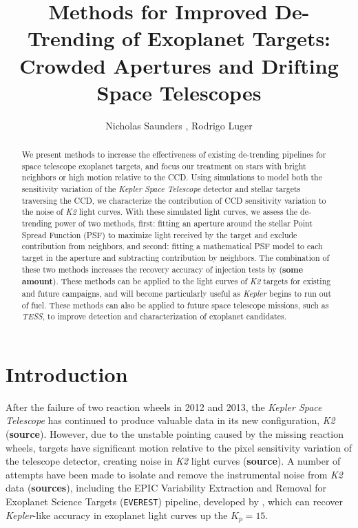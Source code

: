 \documentclass[12pt,preprint]{aastex}
\begin{document}
\title{
	Methods for Improved De-Trending of Exoplanet Targets: Crowded Apertures and Drifting Space Telescopes
}

\author{Nicholas Saunders , Rodrigo Luger }



\begin{abstract}

	We present methods to increase the effectiveness of existing de-trending pipelines for space telescope exoplanet targets, and focus our treatment on stars with bright neighbors or high motion relative to the CCD. Using simulations to model both the sensitivity variation of the \textit{Kepler Space Telescope} detector and stellar targets traversing the CCD, we characterize the contribution of CCD sensitivity variation to the noise of \textit{K2} light curves. With these simulated light curves, we assess the de-trending power of two methods, first: fitting an aperture around the stellar Point Spread Function (PSF) to maximize light received by the target and exclude contribution from neighbors, and second: fitting a mathematical PSF model to each target in the aperture and subtracting contribution by neighbors. The combination of these two methods increases the recovery accuracy of injection tests by (\textbf{some amount}). These methods can be applied to the light curves of \textit{K2} targets for existing and future campaigns, and will become particularly useful as \textit{Kepler} begins to run out of fuel. These methods can also be applied to future space telescope missions, such as \textit{TESS}, to improve detection and characterization of exoplanet candidates.

\end{abstract}

\section{Introduction}

After the failure of two reaction wheels in 2012 and 2013, the \textit{Kepler Space Telescope} has continued to produce valuable data in its new configuration, \textit{K2} (\textbf{source}). However, due to the unstable pointing caused by the missing reaction wheels, targets have significant motion relative to the pixel sensitivity variation of the telescope detector, creating noise in \textit{K2} light curves (\textbf{source}). A number of attempts have been made to isolate and remove the instrumental noise from \textit{K2} data (\textbf{sources}), including the EPIC Variability Extraction and Removal for Exoplanet Science Targets (\texttt{EVEREST}) pipeline, developed by \cite{2017arXiv170205488L}, which can recover \textit{Kepler}-like accuracy in exoplanet light curves up the $K_p = 15$.
\end{document}
